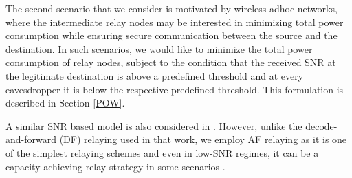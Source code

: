 \documentclass[journal,,draftclsnofoot letterpaper, onecolumn]{IEEEtran}
\begin{document}
The second scenario that we consider is motivated by wireless adhoc networks, where the intermediate relay nodes may be interested in minimizing total power consumption while ensuring secure communication between the source and the destination.
In such scenarios, we would like to minimize the total power consumption of relay nodes, subject to the condition that the received SNR at the legitimate destination is above a predefined threshold and at every eavesdropper it is below the respective predefined threshold.
This formulation is described in Section \ref{POW}. 

A similar SNR based model is also considered in \cite{sarma}. However, unlike the decode-and-forward (DF) relaying used in that work, we employ AF relaying as it is one of the simplest relaying schemes and even in low-SNR regimes, it can be a capacity achieving relay strategy in some scenarios \cite{107gomadamJafar}.
\end{document}

